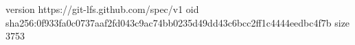 version https://git-lfs.github.com/spec/v1
oid sha256:0f933fa0c0737aaf2fd043c9ac74bb0235d49dd43c6bcc2ff1c4444eedbc4f7b
size 3753
